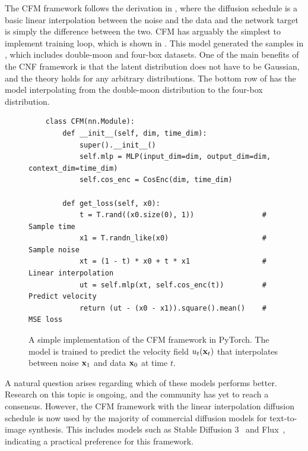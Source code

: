 The \Gls{CFM} framework follows the derivation in , where the diffusion schedule is a basic linear interpolation between the noise and the data and the network target is simply the difference between the two.
\Gls{CFM} has arguably the simplest to implement training loop, which is shown in .
This model generated the samples in , which includes double-moon and four-box datasets.
One of the main benefits of the \Gls{CNF} framework is that the latent distribution does not have to be Gaussian, and the theory holds for any arbitrary distributions.
The bottom row of  has the model interpolating from the double-moon distribution to the four-box distribution.

\begin{figure}
    \centering
    \scriptsize
    \begin{verbatim}
    class CFM(nn.Module):
        def __init__(self, dim, time_dim):
            super().__init__()
            self.mlp = MLP(input_dim=dim, output_dim=dim, context_dim=time_dim)
            self.cos_enc = CosEnc(dim, time_dim)

        def get_loss(self, x0):
            t = T.rand((x0.size(0), 1))                # Sample time
            x1 = T.randn_like(x0)                      # Sample noise
            xt = (1 - t) * x0 + t * x1                 # Linear interpolation
            ut = self.mlp(xt, self.cos_enc(t))         # Predict velocity
            return (ut - (x0 - x1)).square().mean()    # MSE loss
    \end{verbatim}
    \caption{A simple implementation of the \Gls{CFM} framework in PyTorch. The model is trained to predict the velocity field $u_t(\mathbf{x}_t)$ that interpolates between noise $\mathbf{x}_1$ and data $\mathbf{x}_0$ at time $t$.}
    \label{code:cfm}
\end{figure}

A natural question arises regarding which of these models performs better.
Research on this topic is ongoing, and the community has yet to reach a consensus.
However, the \Gls{CFM} framework with the linear interpolation diffusion schedule is now used by the majority of commercial diffusion models for text-to-image synthesis.
This includes models such as Stable Diffusion 3~\cite{SD3} and Flux~\cite{flux2024github}, indicating a practical preference for this framework.

